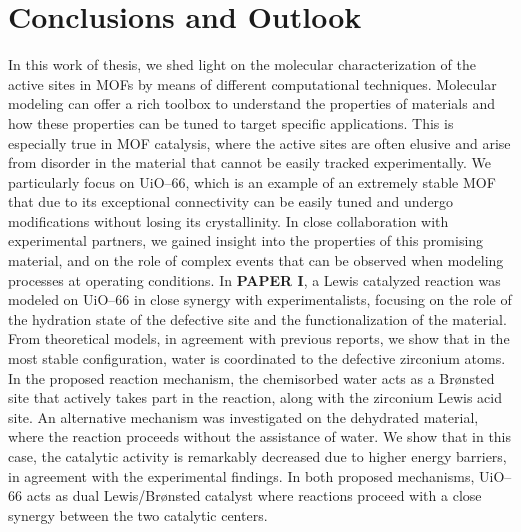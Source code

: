 \graphicspath{{figures/}}
\renewcommand\evenpagerightmark{{\scshape\small Conclusions and perspectives}} 
\renewcommand\oddpageleftmark{{\scshape\small Chapter 4}}


\hyphenation{}

\chapter[Conclusions and perspectives]%
{Conclusions and Outlook}
\label{ch4}
In this work of thesis, we shed light on the molecular characterization of the active sites in MOFs by means of different computational techniques. Molecular modeling can offer a rich toolbox to understand the properties of materials and how these properties can be tuned to target specific applications. This is especially true in MOF catalysis, where the active sites are often elusive and arise from disorder in the material that cannot be easily tracked experimentally. We particularly focus on UiO--66, which is an example of an extremely stable MOF that due to its exceptional connectivity can be easily tuned and undergo modifications without losing its crystallinity. In close collaboration with experimental partners, we gained insight into the properties of this promising material, and on the role of complex events that can be observed when modeling processes at operating conditions.
\npar
In \textbf{PAPER I}, a Lewis catalyzed reaction was modeled on UiO--66 in close synergy with experimentalists, focusing on the role of the hydration state of the defective site and the functionalization of the material. From theoretical models, in agreement with previous reports, we show that in the most stable configuration, water is coordinated to the defective zirconium atoms. In the proposed reaction mechanism, the chemisorbed water acts as a Br\o{}nsted site that actively takes part in the reaction, along with the zirconium Lewis acid site. An alternative mechanism was investigated on the dehydrated material, where the reaction proceeds without the assistance of water. We show that in this case, the catalytic activity is remarkably decreased due to higher energy barriers, in agreement with the experimental findings. In both proposed mechanisms, UiO--66 acts as dual Lewis/Br\o{}nsted catalyst where reactions proceed with a close synergy between the two catalytic centers. 
\npar
